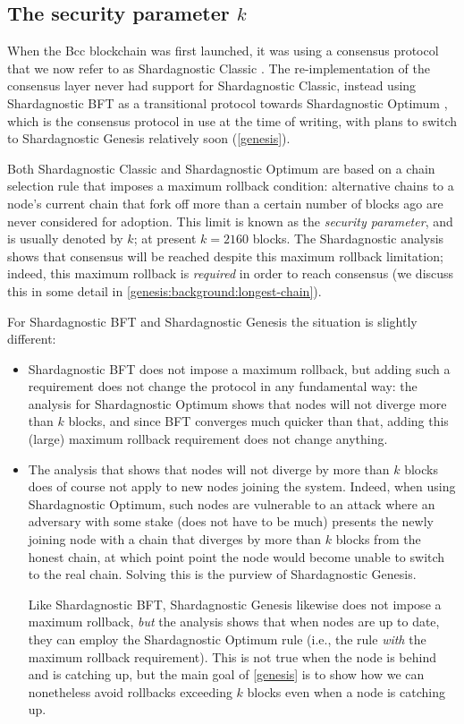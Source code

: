 \subsection{The security parameter $k$}
\label{consensus:overview:k}

When the Bcc blockchain was first launched, it was using a consensus
protocol that we now refer to as Shardagnostic Classic \cite{cryptoeprint:2016:889}.
The re-implementation of the consensus layer never had support for Shardagnostic
Classic, instead using Shardagnostic BFT \cite{cryptoeprint:2018:1049} as a
transitional protocol towards Shardagnostic Optimum \cite{cryptoeprint:2017:573},
which is the consensus protocol in use at the time of writing, with plans to
switch to Shardagnostic Genesis \cite{cryptoeprint:2018:378} relatively soon
(\cref{genesis}).

Both Shardagnostic Classic and Shardagnostic Optimum are based on a chain selection rule
that imposes a maximum rollback condition: alternative chains to a node's
current chain that fork off more than a certain number of blocks ago are never
considered for adoption. This limit is known as the \emph{security parameter},
and is usually denoted by $k$; at present $k = 2160$ blocks. The Shardagnostic
analysis shows that consensus will be reached despite this maximum rollback
limitation; indeed, this maximum rollback is \emph{required} in order to reach
consensus (we discuss this in some detail in
\cref{genesis:background:longest-chain}).

For Shardagnostic BFT and Shardagnostic Genesis the situation is slightly different:

\begin{itemize}
\item Shardagnostic BFT does not impose a maximum rollback, but adding such a
requirement does not change the protocol in any fundamental way: the analysis
for Shardagnostic Optimum shows that nodes will not diverge more than $k$ blocks, and
since BFT converges much quicker than that, adding this (large) maximum rollback
requirement does not change anything.
\item The analysis that shows that nodes will not diverge by more than $k$
blocks does of course not apply to new nodes joining the system. Indeed, when
using Shardagnostic Optimum, such nodes are vulnerable to an attack where an adversary
with some stake (does not have to be much) presents the newly joining node with
a chain that diverges by more than $k$ blocks from the honest chain, at which
point point the node would become unable to switch to the real chain. Solving
this is the purview of Shardagnostic Genesis.

Like Shardagnostic BFT, Shardagnostic Genesis likewise does not impose a maximum
rollback, \emph{but} the analysis \cite{cryptoeprint:2018:378} shows that when
nodes are up to date, they can employ the Shardagnostic Optimum rule (i.e., the rule
\emph{with} the maximum rollback requirement). This is not true when the node is
behind and is catching up, but the main goal of \cref{genesis} is to show how we
can nonetheless avoid rollbacks exceeding $k$ blocks even when a node is
catching up.
\end{itemize}


